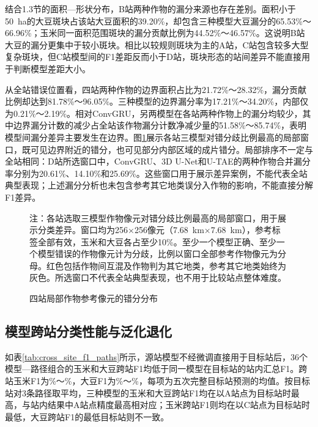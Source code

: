 结合1.3节的面积—形状分布，B站两种作物的漏分来源也存在差别。面积小于50~ha的大豆斑块占该站大豆面积的39.20\%，却包含三种模型大豆漏分的65.53\%～66.96\%；玉米同一面积范围斑块的漏分贡献比例为44.52\%～46.57\%。这说明B站大豆的漏分更集中于较小斑块。相比以较规则斑块为主的A站，C站包含较多大型复杂斑块，但C站模型间的F1差距反而小于D站，斑块形态的站间差异不能直接用于判断模型差距大小。

从全站错误位置看，四站两种作物的边界面积占比为21.72\%～28.32\%，漏分贡献比例却达到81.78\%～96.05\%。三种模型的边界漏分率为17.21\%～34.20\%，内部仅为0.21\%～2.19\%。相对ConvGRU，另两模型在各站两种作物上的漏分均较少，其中边界漏分计数的减少占全站该作物漏分计数净减少量的51.58\%～85.74\%，表明模型间漏分差异主要发生在边界。图\ref{fig:within_site_errors}展示各站三模型对错分歧比例最高的局部窗口，既可见边界附近的错分，也可见部分内部区域的成片错分。局部排序不一定与全站相同：D站所选窗口中，ConvGRU、3D U-Net和U-TAE的两种作物合并漏分率分别为20.61\%、14.10\%和25.69\%。这些窗口用于展示差异案例，不能代表全站典型表现；上述漏分分析也未包含参考其它地类误分入作物的影响，不能直接分解F1差异。

\begin{figure}[tbp]
\centering

\caption{四站局部作物参考像元的错分分布}
\label{fig:within_site_errors}
\par\noindent\begin{minipage}{\textwidth}\songti{}
注：各站选取三模型作物像元对错分歧比例最高的局部窗口，用于展示分类差异。窗口均为256×256像元（7.68~km×7.68~km），参考标签全部有效，玉米和大豆各占至少10\%。至少一个模型正确、至少一个模型错误的作物像元计为分歧，比例以窗口全部参考作物像元为分母。红色包括作物间互混及作物判为其它地类，参考其它地类始终为灰色。所选窗口不代表全站典型表现，也不用于比较站点整体难度。
\end{minipage}
\end{figure}

\FloatBarrier

\subsection{模型跨站分类性能与泛化退化}


如表\ref{tab:cross_site_f1_paths}所示，源站模型不经微调直接用于目标站后，36个模型—路径组合的玉米和大豆跨站F1均低于同一模型在目标站的站内汇总F1。跨站玉米F1为\FCrossCornMin{}\%～\FCrossCornMax{}\%，大豆F1为\FCrossSoyMin{}\%～\FCrossSoyMax{}\%，每项为五次完整目标站预测的均值。按目标站对3条路径取平均，三种模型的玉米和大豆跨站F1均在以A站点为目标站时最高，与站内结果中A站点精度最高相对应；玉米跨站F1则均在以C站点为目标站时最低，大豆跨站F1的最低目标站则不一致。

